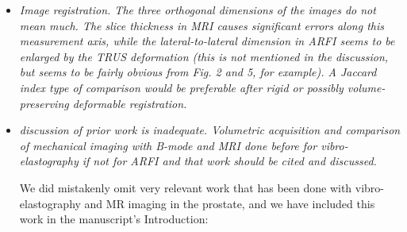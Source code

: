\documentclass[10pt]{article}
\begin{document}
\begin{itemize}
    \item \textit{Image registration. The three orthogonal dimensions of the
            images do not mean much. The slice thickness in MRI causes
            significant errors along this measurement axis, while the
            lateral-to-lateral dimension in ARFI seems to be enlarged by the
            TRUS deformation (this is not mentioned in the discussion, but
            seems to be fairly obvious from Fig. 2 and 5, for example). A
            Jaccard index type of comparison would be preferable after rigid or
            possibly volume-preserving deformable registration.}

    \item \textit{discussion of prior work is inadequate. Volumetric
            acquisition and comparison of mechanical imaging with B-mode and
            MRI done before for vibro-elastography if not for ARFI and that
            work should be cited and discussed.}

    We did mistakenly omit very relevant work that has been done with
    vibro-elastography and MR imaging in the prostate, and we have included
    this work in the manuscript's Introduction:

    \textbf{}

\end{itemize}
\end{document}

